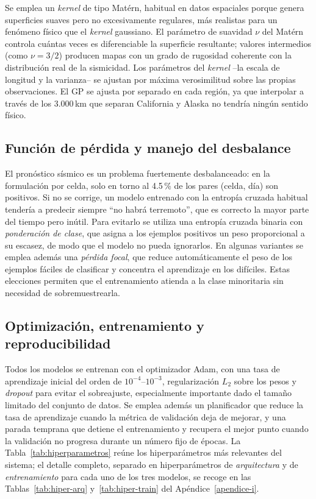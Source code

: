 Se emplea un \textit{kernel} de tipo Matérn, habitual en datos espaciales porque genera
superficies suaves pero no excesivamente regulares, más realistas para un fenómeno físico que el
\textit{kernel} gaussiano. El parámetro de suavidad \(\nu\) del Matérn controla cuántas veces es
diferenciable la superficie resultante; valores intermedios (como \(\nu = 3/2\)) producen mapas
con un grado de rugosidad coherente con la distribución real de la sismicidad. Los parámetros del
\textit{kernel} --la escala de longitud y la varianza-- se ajustan por máxima verosimilitud sobre
las propias observaciones. El GP se ajusta por separado en cada región, ya que interpolar a
través de los 3.000\,km que separan California y Alaska no tendría ningún sentido físico.

\subsection{Función de pérdida y manejo del desbalance}
\label{md-loss}

El pronóstico sísmico es un problema fuertemente desbalanceado: en la formulación por celda,
solo en torno al 4.5\,\% de los pares (celda, día) son positivos. Si no se corrige, un
modelo entrenado con la entropía cruzada habitual tendería a predecir siempre ``no habrá
terremoto'', que es correcto la mayor parte del tiempo pero inútil. Para evitarlo se utiliza
una entropía cruzada binaria con \emph{ponderación de clase}, que asigna a los ejemplos
positivos un peso proporcional a su escasez, de modo que el modelo no pueda ignorarlos. En
algunas variantes se emplea además una \emph{pérdida focal}, que reduce automáticamente el
peso de los ejemplos fáciles de clasificar y concentra el aprendizaje en los difíciles. Estas
elecciones permiten que el entrenamiento atienda a la clase minoritaria sin necesidad de
sobremuestrearla.

\subsection{Optimización, entrenamiento y reproducibilidad}
\label{md-optim}

Todos los modelos se entrenan con el optimizador Adam, con una tasa de aprendizaje inicial
del orden de \(10^{-4}\)--\(10^{-3}\), regularización \(L_2\) sobre los pesos y
\textit{dropout} para evitar el sobreajuste, especialmente importante dado el tamaño limitado
del conjunto de datos. Se emplea además un planificador que reduce la tasa de aprendizaje
cuando la métrica de validación deja de mejorar, y una parada temprana que detiene el
entrenamiento y recupera el mejor punto cuando la validación no progresa durante un número
fijo de épocas. La Tabla~\ref{tab:hiperparametros} reúne los hiperparámetros más relevantes
del sistema; el detalle completo, separado en hiperparámetros de \emph{arquitectura} y de
\emph{entrenamiento} para cada uno de los tres modelos, se recoge en las
Tablas~\ref{tab:hiper-arq} y~\ref{tab:hiper-train} del Apéndice~\ref{apendice-i}.

